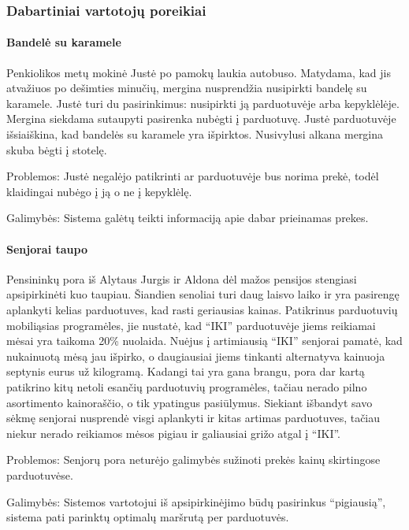 \documentclass{article}
\begin{document}
\subsubsection{Dabartiniai vartotojų poreikiai}
\paragraph{Bandelė su karamele}
	Penkiolikos metų mokinė Justė po pamokų laukia autobuso. Matydama, kad jis atvažiuos po dešimties minučių, mergina nusprendžia nusipirkti bandelę su karamele. Justė turi du pasirinkimus: nusipirkti ją parduotuvėje arba kepyklėlėje. Mergina siekdama sutaupyti pasirenka nubėgti į parduotuvę. Justė parduotuvėje išsiaiškina, kad bandelės su karamele yra išpirktos. Nusivylusi alkana mergina skuba bėgti į stotelę.\par
Problemos: Justė negalėjo patikrinti ar parduotuvėje bus norima prekė, todėl klaidingai nubėgo į ją o ne į kepyklėlę.\par
Galimybės: Sistema galėtų teikti informaciją apie dabar prieinamas prekes.
\paragraph{Senjorai taupo}
	Pensininkų pora iš Alytaus Jurgis ir Aldona dėl mažos pensijos stengiasi apsipirkinėti kuo taupiau. Šiandien senoliai turi daug laisvo laiko ir yra pasirengę aplankyti kelias parduotuves, kad rasti geriausias kainas. Patikrinus parduotuvių mobiliąsias programėles, jie nustatė, kad “IKI” parduotuvėje jiems reikiamai mėsai yra taikoma 20\% nuolaida. Nuėjus į artimiausią “IKI” senjorai pamatė, kad nukainuotą mėsą jau išpirko, o daugiausiai jiems tinkanti alternatyva kainuoja septynis eurus už kilogramą. Kadangi tai yra gana brangu, pora dar kartą patikrino kitų netoli esančių parduotuvių programėles, tačiau nerado pilno asortimento kainoraščio, o tik ypatingus pasiūlymus. Siekiant išbandyt savo sėkmę senjorai nusprendė visgi aplankyti ir kitas artimas parduotuves, tačiau niekur nerado reikiamos mėsos pigiau ir galiausiai grižo atgal į “IKI”.\par
Problemos: Senjorų pora neturėjo galimybės sužinoti prekės kainų skirtingose parduotuvėse.\par
Galimybės: Sistemos vartotojui iš apsipirkinėjimo būdų pasirinkus “pigiausią”, sistema pati parinktų optimalų maršrutą per parduotuvės.
\end{document}
